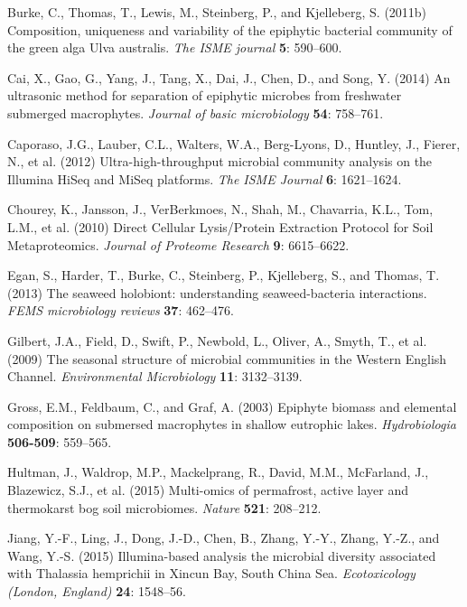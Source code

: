 \documentclass[12pt,]{article}
\begin{document}
\hypertarget{ref-Burke2011b}{}
Burke, C., Thomas, T., Lewis, M., Steinberg, P., and Kjelleberg, S.
(2011b) Composition, uniqueness and variability of the epiphytic
bacterial community of the green alga Ulva australis. \emph{The ISME
journal} \textbf{5}: 590--600.

\hypertarget{ref-Cai2014}{}
Cai, X., Gao, G., Yang, J., Tang, X., Dai, J., Chen, D., and Song, Y.
(2014) An ultrasonic method for separation of epiphytic microbes from
freshwater submerged macrophytes. \emph{Journal of basic microbiology}
\textbf{54}: 758--761.

\hypertarget{ref-Caporaso2012}{}
Caporaso, J.G., Lauber, C.L., Walters, W.A., Berg-Lyons, D., Huntley,
J., Fierer, N., et al. (2012) Ultra-high-throughput microbial community
analysis on the Illumina HiSeq and MiSeq platforms. \emph{The ISME
Journal} \textbf{6}: 1621--1624.

\hypertarget{ref-Chourey2010}{}
Chourey, K., Jansson, J., VerBerkmoes, N., Shah, M., Chavarria, K.L.,
Tom, L.M., et al. (2010) Direct Cellular Lysis/Protein Extraction
Protocol for Soil Metaproteomics. \emph{Journal of Proteome Research}
\textbf{9}: 6615--6622.

\hypertarget{ref-Egan2013}{}
Egan, S., Harder, T., Burke, C., Steinberg, P., Kjelleberg, S., and
Thomas, T. (2013) The seaweed holobiont: understanding seaweed-bacteria
interactions. \emph{FEMS microbiology reviews} \textbf{37}: 462--476.

\hypertarget{ref-Gilbert2009}{}
Gilbert, J.A., Field, D., Swift, P., Newbold, L., Oliver, A., Smyth, T.,
et al. (2009) The seasonal structure of microbial communities in the
Western English Channel. \emph{Environmental Microbiology} \textbf{11}:
3132--3139.

\hypertarget{ref-Gross2003}{}
Gross, E.M., Feldbaum, C., and Graf, A. (2003) Epiphyte biomass and
elemental composition on submersed macrophytes in shallow eutrophic
lakes. \emph{Hydrobiologia} \textbf{506-509}: 559--565.

\hypertarget{ref-Hultman2015}{}
Hultman, J., Waldrop, M.P., Mackelprang, R., David, M.M., McFarland, J.,
Blazewicz, S.J., et al. (2015) Multi-omics of permafrost, active layer
and thermokarst bog soil microbiomes. \emph{Nature} \textbf{521}:
208--212.

\hypertarget{ref-Jiang2015}{}
Jiang, Y.-F., Ling, J., Dong, J.-D., Chen, B., Zhang, Y.-Y., Zhang,
Y.-Z., and Wang, Y.-S. (2015) Illumina-based analysis the microbial
diversity associated with Thalassia hemprichii in Xincun Bay, South
China Sea. \emph{Ecotoxicology (London, England)} \textbf{24}: 1548--56.
\end{document}
